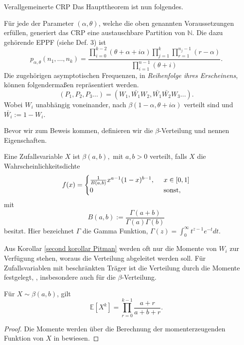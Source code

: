 \begin{section}{Verallgemeinerte CRP}
Das Haupttheorem ist nun folgendes.
\begin{theorem}
    \label{Main theorem CRP}
    Für jede der Parameter $(\alpha,\theta)$, welche die oben genannten Voraussetzungen erfüllen, generiert das CRP eine austauschbare  Partition von $\mathbb{N}$. Die dazu gehörende EPPF (siehe Def. 3) ist 
    \begin{equation}
   p_{\alpha,\theta}(n_1,...,n_k) = \frac{\displaystyle \prod_{i=0}^{k-2}(\theta + \alpha + i\alpha)\prod_{j=1}^{k}\prod_{r=1}^{n_j-1}(r-\alpha)}{\displaystyle\prod_{i=1}^{n-1}(\theta  + i)}.
    \end{equation}
    Die zugehörigen asymptotischen Frequenzen, in \textit{Reihenfolge ihres Erscheinens}, können folgendermaßen repräsentiert werden.
    \[
    (P_1,P_2,P_3...) = (W_1,\bar{W_1}W_2,\bar{W_1}\bar{W_2}W_3...).
    \]
    Wobei $W_i$ unabhängig voneinander, nach $\beta(1 - \alpha, \theta + i\alpha)$ verteilt sind und $\bar{W_i}:= 1 - W_i$.
\end{theorem} 
Bevor wir zum Beweis kommen, definieren wir die $\beta$-Verteilung und nennen Eigenschaften.
\begin{Definition}
    \label{definition beta distribution}
    Eine Zufallsvariable $X$ ist $\beta(a,b),$ mit $ a,b > 0 $ verteilt, falls $X$ die Wahrscheinlichkeitsdichte 
    \[
        f(x) =
        \begin{cases}
        \frac{1}{B(a,b)} x^{a-1}(1-x)^{b-1}, \hspace{5pt} &x \in [0,1]  \\
        0 &\textnormal{sonst},
        \end{cases} 
   \]
mit 
\[
    B(a,b):= \frac{\Gamma(a+b)}{\Gamma(a)\Gamma(b)}
\]
besitzt. Hier bezeichnet $\Gamma$ die Gamma Funktion, $\Gamma(z)= \int_{0}^{\infty} t^{z-1}e^{-t}dt$.
\end{Definition}
Aus Korollar \ref{second korollar Pitman} werden oft nur die Momente von $W_i$ zur Verfügung stehen, woraus die Verteilung abgeleitet werden soll. Für Zufallsvariablen mit beschränkten Träger ist die Verteilung durch die Momente festgelegt, \cite[Theorem 30.1]{billingsley1995probability}, insbesondere auch für die $\beta$-Verteilung.
\begin{lemma}
    Für $X \sim \beta(a,b)$, gilt
    \[
    \mathbb{E}[X^k] = \prod_{r=0}^{k-1}\frac{a+r}{a+b  + r}.
    \]
\end{lemma}
\begin{proof}
    Die Momente werden über die Berechnung der momenterzeugenden Funktion von $X$ in \cite[Kapitel 25]{johnson1995continuous} bewiesen. 
\end{proof}


\end{section}
